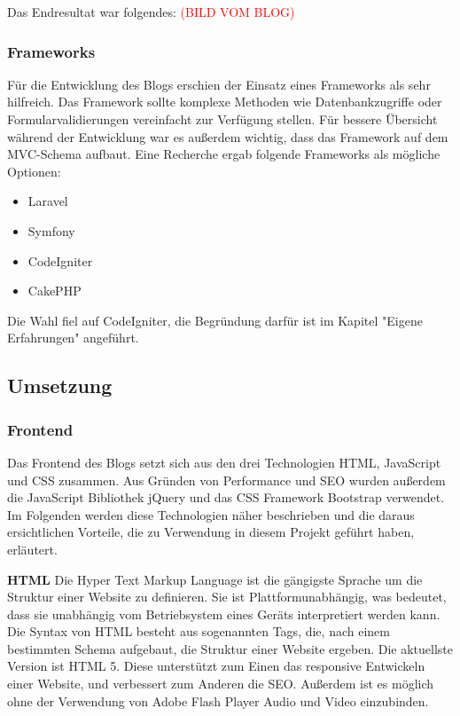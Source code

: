     Das Endresultat war folgendes:
    \textcolor{red}{(BILD VOM BLOG)}

    \subsubsection{Frameworks}
    Für die Entwicklung des Blogs erschien der Einsatz eines Frameworks als sehr hilfreich. Das Framework sollte komplexe Methoden wie
    Datenbankzugriffe oder Formularvalidierungen vereinfacht zur Verfügung stellen. Für bessere Übersicht während der Entwicklung war es außerdem
    wichtig, dass das Framework auf dem MVC-Schema aufbaut. Eine Recherche ergab folgende Frameworks als mögliche
    Optionen:

    \begin{itemize}
      \item Laravel
      \item Symfony
      \item CodeIgniter
      \item CakePHP
    \end{itemize}

    Die Wahl fiel auf CodeIgniter, die Begründung darfür ist im Kapitel "Eigene Erfahrungen" angeführt.

  \subsection{Umsetzung}

    \subsubsection{Frontend}
    Das Frontend des Blogs setzt sich aus den drei Technologien HTML, JavaScript und CSS zusammen. Aus Gründen von Performance und SEO wurden außerdem
    die JavaScript Bibliothek jQuery und das CSS Framework Bootstrap verwendet. Im Folgenden werden diese Technologien näher beschrieben und die daraus
    ersichtlichen Vorteile, die zu Verwendung in diesem Projekt geführt haben, erläutert.

    \textbf{HTML}
    {Die Hyper Text Markup Language\cite{html}} ist die gängigste Sprache um die Struktur einer Website zu definieren. Sie ist Plattformunabhängig, was bedeutet,
    dass sie unabhängig vom Betriebsystem eines Geräts interpretiert werden kann. Die Syntax von HTML besteht aus sogenannten Tags, die, nach einem
    bestimmten Schema aufgebaut, die Struktur einer Website ergeben. Die aktuellste Version ist HTML 5. Diese unterstützt zum Einen das responsive
    Entwickeln einer Website, und verbessert zum Anderen die SEO. Außerdem ist es möglich ohne der Verwendung von Adobe Flash Player Audio und Video einzubinden.

